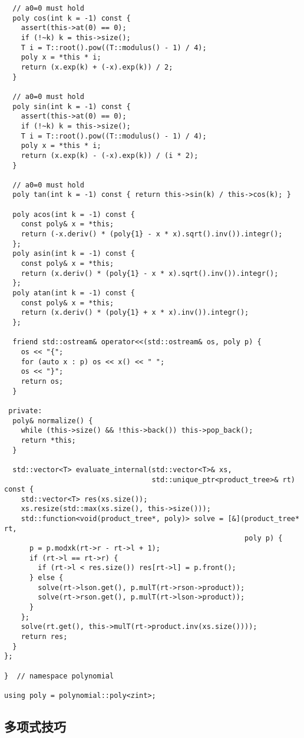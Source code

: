 \documentclass[6pt]{article}
\begin{document}
\begin{multicols}{2}
\begin{lstlisting}
  // a0=0 must hold
  poly cos(int k = -1) const {
    assert(this->at(0) == 0);
    if (!~k) k = this->size();
    T i = T::root().pow((T::modulus() - 1) / 4);
    poly x = *this * i;
    return (x.exp(k) + (-x).exp(k)) / 2;
  }

  // a0=0 must hold
  poly sin(int k = -1) const {
    assert(this->at(0) == 0);
    if (!~k) k = this->size();
    T i = T::root().pow((T::modulus() - 1) / 4);
    poly x = *this * i;
    return (x.exp(k) - (-x).exp(k)) / (i * 2);
  }

  // a0=0 must hold
  poly tan(int k = -1) const { return this->sin(k) / this->cos(k); }

  poly acos(int k = -1) const {
    const poly& x = *this;
    return (-x.deriv() * (poly{1} - x * x).sqrt().inv()).integr();
  };
  poly asin(int k = -1) const {
    const poly& x = *this;
    return (x.deriv() * (poly{1} - x * x).sqrt().inv()).integr();
  };
  poly atan(int k = -1) const {
    const poly& x = *this;
    return (x.deriv() * (poly{1} + x * x).inv()).integr();
  };

  friend std::ostream& operator<<(std::ostream& os, poly p) {
    os << "{";
    for (auto x : p) os << x() << " ";
    os << "}";
    return os;
  }

 private:
  poly& normalize() {
    while (this->size() && !this->back()) this->pop_back();
    return *this;
  }

  std::vector<T> evaluate_internal(std::vector<T>& xs,
                                   std::unique_ptr<product_tree>& rt) const {
    std::vector<T> res(xs.size());
    xs.resize(std::max(xs.size(), this->size()));
    std::function<void(product_tree*, poly)> solve = [&](product_tree* rt,
                                                         poly p) {
      p = p.modxk(rt->r - rt->l + 1);
      if (rt->l == rt->r) {
        if (rt->l < res.size()) res[rt->l] = p.front();
      } else {
        solve(rt->lson.get(), p.mulT(rt->rson->product));
        solve(rt->rson.get(), p.mulT(rt->lson->product));
      }
    };
    solve(rt.get(), this->mulT(rt->product.inv(xs.size())));
    return res;
  }
};

}  // namespace polynomial

using poly = polynomial::poly<zint>;
\end{lstlisting}


  \subsection{多项式技巧}


\end{multicols}
\end{document}
